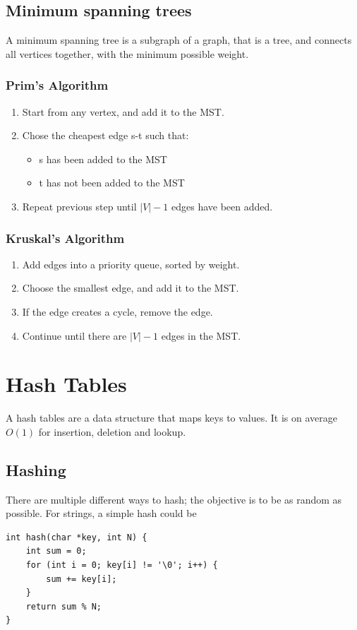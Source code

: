 \documentclass[14]{article}
\begin{document}
\subsection{Minimum spanning trees}
A minimum spanning tree is a subgraph of a graph, that is a tree, and connects all vertices together, with the minimum
possible weight.
\subsubsection{Prim's Algorithm}
\begin{enumerate}
    \item Start from any vertex, and add it to the MST.
    \item Chose the cheapest edge s-t such that:
        \begin{itemize}
            \item s has been added to the MST
            \item t has not been added to the MST
        \end{itemize}
    \item Repeat previous step until $|V| - 1$ edges have been added.
\end{enumerate}
\subsubsection{Kruskal's Algorithm}
\begin{enumerate}
    \item Add edges into a priority queue, sorted by weight.
    \item Choose the smallest edge, and add it to the MST.
    \item If the edge creates a cycle, remove the edge.
    \item Continue until there are $|V| - 1$ edges in the MST.
\end{enumerate}
\section{Hash Tables}
A hash tables are a data structure that maps keys to values. It is on average $O(1)$ for insertion, deletion and lookup.
\subsection{Hashing}
There are multiple different ways to hash; the objective is to be as random as possible. For strings, a simple hash could be
\begin{verbatim}
int hash(char *key, int N) {
    int sum = 0;
    for (int i = 0; key[i] != '\0'; i++) {
        sum += key[i];
    }
    return sum % N;
}
\end{verbatim}
\end{document}
